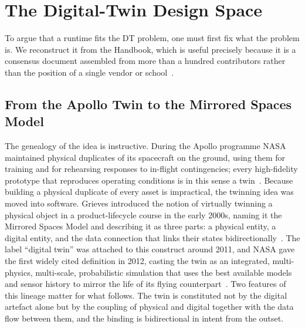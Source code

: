 \documentclass[conference]{IEEEtran}
\newcommand{\dt}{DT\xspace}
\begin{document}
\section{The Digital-Twin Design Space}
\label{sec:space}
To argue that a runtime fits the \dt problem, one must first fix what the
problem is. We reconstruct it from the Handbook, which is useful precisely
because it is a consensus document assembled from more than a hundred
contributors rather than the position of a single vendor or
school~\cite{handbook}.

\subsection{From the Apollo Twin to the Mirrored Spaces Model}
The genealogy of the idea is instructive. During the Apollo programme NASA
maintained physical duplicates of its spacecraft on the ground, using them for
training and for rehearsing responses to in-flight contingencies; every
high-fidelity prototype that reproduces operating conditions is in this sense a
twin~\cite{agrawal2024}. Because building a physical duplicate of every asset is
impractical, the twinning idea was moved into software. Grieves introduced the
notion of virtually twinning a physical object in a product-lifecycle course in
the early 2000s, naming it the Mirrored Spaces Model and describing it as three
parts: a physical entity, a digital entity, and the data connection that links
their states bidirectionally~\cite{grieves2017,agrawal2024}. The label
``digital twin'' was attached to this construct around 2011, and NASA gave the
first widely cited definition in 2012, casting the twin as an integrated,
multi-physics, multi-scale, probabilistic simulation that uses the best
available models and sensor history to mirror the life of its flying
counterpart~\cite{glaessgen2012}. Two features of this lineage matter for what
follows. The twin is constituted not by the digital artefact alone but by the
coupling of physical and digital together with the data flow between them, and
the binding is bidirectional in intent from the outset.
\end{document}
